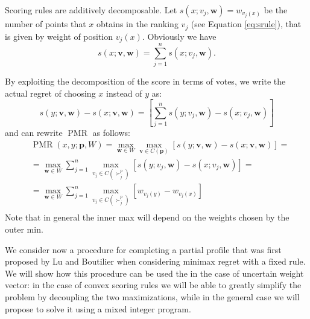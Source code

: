 \documentclass[12pt]{article}
\newcommand{\profile}{\textbf{v}}%
\newcommand{\pprofile}{\textbf{p}}%
\newcommand{\w}{\textbf{w}}%
\DeclareMathOperator{\PMR}{PMR}
\begin{document}
Scoring rules are additively decomposable.
Let $s(x; v_j,\w)=w_{v_j(x)}$ be the number of points that $x$ obtains in the ranking $v_j$ (see Equation \ref{eq:srule}), that is given by weight of position $v_j(x)$.
Obviously we have 
\[ s(x; \profile, \w) = \sum_{j=1}^n s(x; v_j,\w). \]

By exploiting the decomposition of the score in terms of votes, we write the actual regret of choosing $x$ instead of $y$ as:
\[
s(y; \profile,\w) - s(x; \profile, \w) = [\sum_{j=1}^n s(y; v_j,\w) - s(x; v_j,\w)]
\]
and  can rewrite $\PMR$ as follows:
\begin{align*}
& \PMR(x,y; \pprofile, W) = \max_{\w \in W} \max_{\profile \in C(\pprofile)} [ s(y; \profile,\w) - s(x; \profile,\w) ] = \\
& =  \max_{\w \in W} \sum_{j=1}^{n} \max_{v_j \in C(\succ_j^p)} [s(y; v_j,\w) - s(x; v_j,\w)]=\\
& =  \max_{\w \in W} \sum_{j=1}^{n} \max_{v_j \in C(\succ_j^p)} [w_{v_j(y)} - w_{v_j(x)}] \\
\end{align*}
Note that in general the inner max will depend on the weights chosen by the outer min.

We consider now a procedure for completing a partial profile that was first proposed by Lu and Boutilier \cite{Lu2011} when considering minimax regret with a fixed rule.
We will show how this procedure can be used the in the case of uncertain weight vector:
in the case of convex scoring rules we will be able to greatly simplify the problem by decoupling the two maximizations, while in the general case we will propose to solve it using a mixed integer program.
\end{document}
